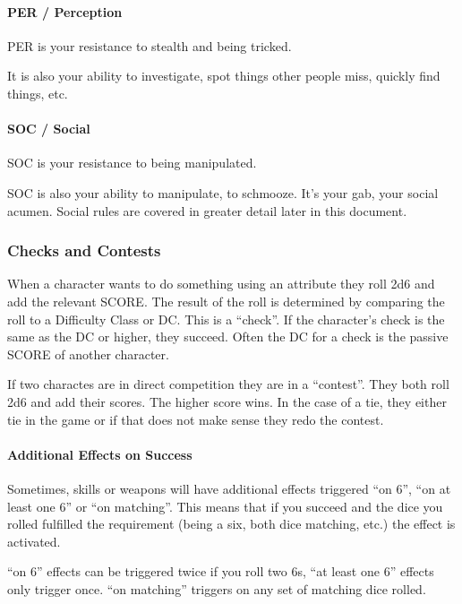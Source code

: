 \documentclass[
  letterpaper,
  DIV=11,
  numbers=noendperiod]{scrartcl}
\let\oldparagraph\paragraph
\renewcommand{\paragraph}[1]{\oldparagraph{#1}\mbox{}}
\begin{document}
\paragraph{PER / Perception}\label{per-perception}

PER is your resistance to stealth and being tricked.

It is also your ability to investigate, spot things other people miss,
quickly find things, etc.

\paragraph{SOC / Social}\label{soc-social}

SOC is your resistance to being manipulated.

SOC is also your ability to manipulate, to schmooze. It's your gab, your
social acumen. Social rules are covered in greater detail later in this
document.

\subsubsection{Checks and Contests}\label{checks-and-contests}

When a character wants to do something using an attribute they roll 2d6
and add the relevant SCORE. The result of the roll is determined by
comparing the roll to a Difficulty Class or DC. This is a ``check''. If
the character's check is the same as the DC or higher, they succeed.
Often the DC for a check is the passive SCORE of another character.

If two charactes are in direct competition they are in a ``contest''.
They both roll 2d6 and add their scores. The higher score wins. In the
case of a tie, they either tie in the game or if that does not make
sense they redo the contest.

\paragraph{Additional Effects on
Success}\label{additional-effects-on-success}

Sometimes, skills or weapons will have additional effects triggered ``on
6'', ``on at least one 6'' or ``on matching''. This means that if you
succeed and the dice you rolled fulfilled the requirement (being a six,
both dice matching, etc.) the effect is activated.

``on 6'' effects can be triggered twice if you roll two 6s, ``at least
one 6'' effects only trigger once. ``on matching'' triggers on any set
of matching dice rolled.
\end{document}
